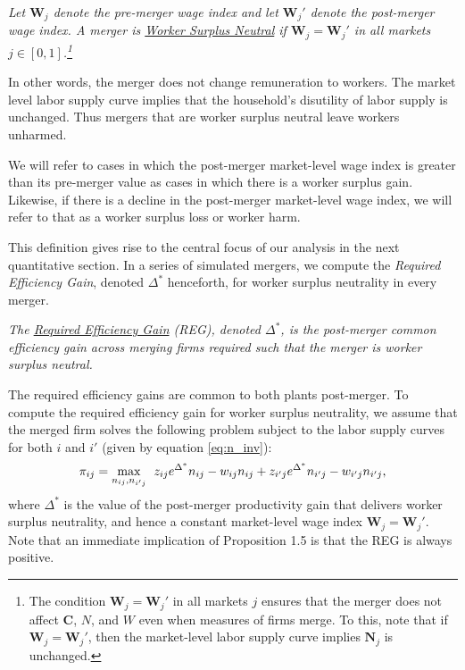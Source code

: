 \documentclass[12pt]{article}
\newcommand{\redSM}{\textcolor[rgb]{0.89,0.08,0.24}}    %
\theoremstyle{prop}
\begin{document}
\medskip


\emph{Let ${\mathbf{W}_j}$ denote the pre-merger wage index and let ${\mathbf{W}_j'}$  denote the post-merger wage index.  
A merger is \textit{\underline{Worker Surplus Neutral}}  if $\mathbf{W}_j =\mathbf{W}_j'$ in all markets $j\in[0,1]$.\footnote{The condition $\mathbf{W}_j=\mathbf{W}_j'$ in all markets $j$ ensures that the merger does not affect $\mathbf{C}$,  $N$, and  $W$ even when measures of firms merge. To this, note that if  $\mathbf{W}_j=\mathbf{W}_j'$, then the market-level labor supply curve implies $\mathbf{N}_j$ is unchanged. } }
 
 \medskip

In other words, the merger does not change remuneration to workers. 
The market level labor supply curve implies that the household's disutility of labor supply is unchanged. Thus mergers that are worker surplus neutral leave workers unharmed.

We will refer to cases in which the post-merger market-level wage index is greater than its pre-merger value as cases in which there is a worker surplus gain. 
Likewise, if there is a decline in the  post-merger market-level wage index, we will refer to that as a worker surplus loss or worker harm. 

This definition gives rise to the central focus of our analysis in the next quantitative section. 
In a series of simulated mergers, we compute the \emph{Required Efficiency Gain}, denoted $\Delta^*$ henceforth, for worker surplus neutrality in every merger.  

\medskip 
{}  
\emph{The \underline{Required Efficiency Gain} (REG), denoted $\Delta^*$, is the post-merger common efficiency gain across merging firms required such that the merger is worker surplus neutral.}

The required efficiency gains are common to both plants post-merger. 
To compute the required efficiency gain for worker surplus neutrality, we assume that the merged firm solves the following problem subject to the labor supply curves for both $i$ and $i'$ (given by equation \eqref{eq:n_inv}):
{\vspace*{-.2cm}\begin{equation}
\label{eq:ws_neutral_delta_star}
	\pi_{ij} = \max_{n_{ij}, n_{i'j}}\:\: z_{ij} e^{\Delta^{*}}  n_{ij}  -w_{ij}n_{ij} +z_{i'j} e^{\Delta^{*}}  n_{i'j}  -w_{i'j}n_{i'j},
\vspace*{-.2cm}\end{equation}}%
where $\Delta^{*}$ is the value of the post-merger productivity gain that delivers worker surplus neutrality, and hence a constant market-level wage index $\mathbf{W}_j=\mathbf{W}_j'$.
Note that an immediate implication of Proposition 1.5 is that the REG is always positive. 
\end{document}

